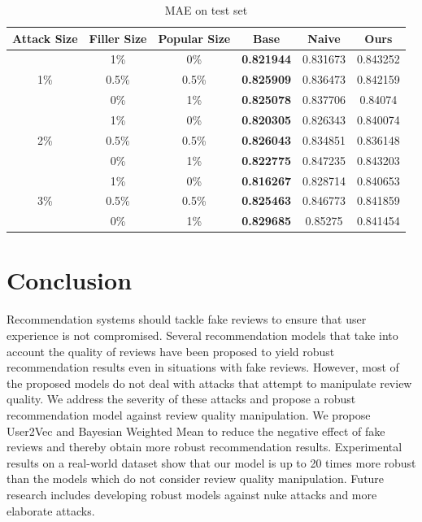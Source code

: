 \documentclass[master,english,final]{kaist-ucs}
\begin{document}
\begin{table}[h]
\caption{MAE on test set}
\label{resultMAE}
\begin{center}
\begin{tabular}{|c|c|c|c|c|c|}
\hline
\textbf{Attack Size} & \textbf{Filler Size} & \textbf{Popular Size} & \textbf{Base} & \textbf{Naive} & \textbf{Ours}     \\ \hline
\multirow{3}{*}{1\%} & 1\%                  & 0\%                   & \textbf{0.821944}      & 0.831673       & 0.843252 \\ \cline{2-6}
                     & 0.5\%               & 0.5\%                & \textbf{0.825909}      & 0.836473       & 0.842159 \\ \cline{2-6}
                     & 0\%                  & 1\%                   & \textbf{0.825078}      & 0.837706       & 0.84074  \\ \hline
\multirow{3}{*}{2\%} & 1\%                  & 0\%                   & \textbf{0.820305}      & 0.826343       & 0.840074 \\ \cline{2-6}
                     & 0.5\%               & 0.5\%                & \textbf{0.826043}      & 0.834851       & 0.836148 \\ \cline{2-6}
                     & 0\%                  & 1\%                   & \textbf{0.822775}      & 0.847235       & 0.843203 \\ \hline
\multirow{3}{*}{3\%} & 1\%                  & 0\%                   & \textbf{0.816267}      & 0.828714       & 0.840653 \\ \cline{2-6}
                     & 0.5\%               & 0.5\%                & \textbf{0.825463}      & 0.846773       & 0.841859 \\ \cline{2-6}
                     & 0\%                  & 1\%                   & \textbf{0.829685}      & 0.85275        & 0.841454 \\ \hline
\end{tabular}
\end{center}
\end{table}


\chapter{Conclusion}
Recommendation systems should tackle fake reviews to ensure that user experience is not compromised.
Several recommendation models that take into account the quality of reviews have been proposed to yield robust recommendation results even in situations with fake reviews.
However, most of the proposed models do not deal with attacks that attempt to manipulate review quality.
We address the severity of these attacks and propose a robust recommendation model against review quality manipulation.
We propose User2Vec and Bayesian Weighted Mean to reduce the negative effect of fake reviews and thereby obtain more robust recommendation results.
Experimental results on a real-world dataset show that our model is up to 20 times more robust than the models which do not consider review quality manipulation.
Future research includes developing robust models against nuke attacks and more elaborate attacks.
\end{document}
